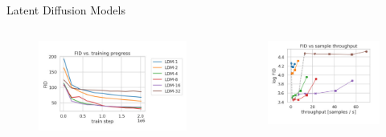 \begin{frame}[allowframebreaks]{Latent Diffusion Models}
    \begin{columns}
            \begin{figure}
                \centering
                \includegraphics[width=1.05\linewidth,height=\textheight,keepaspectratio]{images/adv-img-gen/slide_98_1_img.png}
            \end{figure}
            \begin{figure}
                \centering
                \includegraphics[width=\linewidth,height=\textheight,keepaspectratio]{images/adv-img-gen/slide_98_2_img.png}
            \end{figure}
    \end{columns}   
    
\end{frame}

